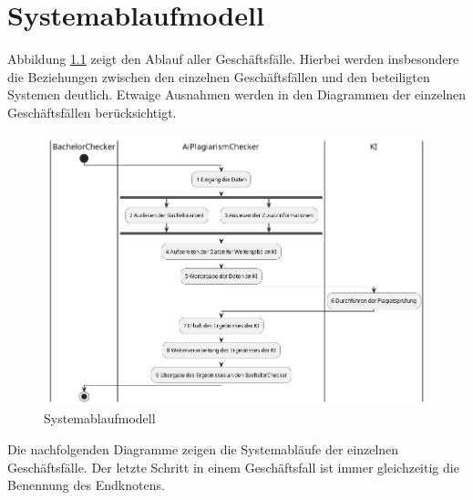 \chapter{Systemablaufmodell}\label{ch:systemablaufmodell}

Abbildung \ref{fig:systemablaufmodell} zeigt den Ablauf aller Geschäftsfälle.
Hierbei werden insbesondere die Beziehungen zwischen den einzelnen Geschäftsfällen und den beteiligten Systemen deutlich.
Etwaige Ausnahmen werden in den Diagrammen der einzelnen Geschäftsfällen berücksichtigt.

\begin{figure}[H]
    \centering
    \includegraphics[width=1\textwidth]{images/diagrams/businessProcessDiagram/Systemablaufmodell.png}
    \caption{Systemablaufmodell}
    \label{fig:systemablaufmodell}
\end{figure}

\newpage Die nachfolgenden Diagramme zeigen die Systemabläufe der einzelnen Geschäftsfälle.
Der letzte Schritt in einem Geschäftsfall ist immer gleichzeitig die Benennung des Endknotens.

